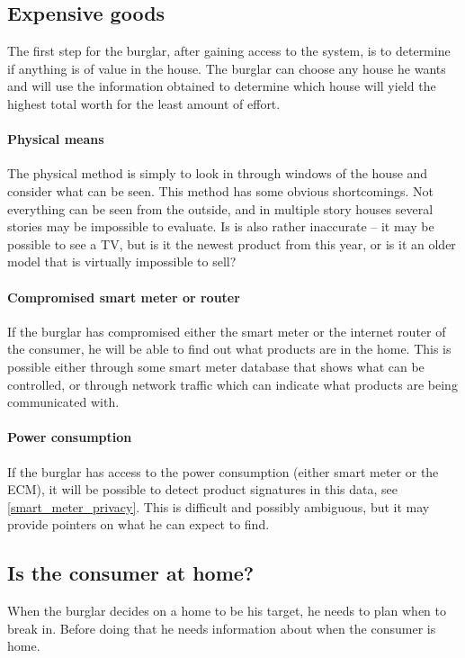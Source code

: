 \subsection{Expensive goods}
The first step for the burglar, after gaining access to the system, is to determine if anything is of value in the house. 
The burglar can choose any house he wants and will use the information obtained to determine which house will yield the highest total worth for the least amount of effort.

\paragraph{Physical means}
The physical method is simply to look in through windows of the house and consider what can be seen. 
This method has some obvious shortcomings.
Not everything can be seen from the outside, and in multiple story houses several stories may be impossible to evaluate.
Is is also rather inaccurate -- it may be possible to see a TV, but is it the newest product from this year, or is it an older model that is virtually impossible to sell?

\paragraph{Compromised smart meter or router}
If the burglar has compromised either the smart meter or the internet router of the consumer, he will be able to find out what products are in the home. 
This is possible either through some smart meter database that shows what can be controlled, or through network traffic which can indicate what products are being communicated with.

\paragraph{Power consumption}
If the burglar has access to the power consumption (either smart meter or the ECM), it will be possible to detect product signatures in this data, see \cref{smart_meter_privacy}.
This is difficult and possibly ambiguous, but it may provide pointers on what he can expect to find.

\subsection{Is the consumer at home?}
When the burglar decides on a home to be his target, he needs to plan when to break in.
Before doing that he needs information about when the consumer is home.

